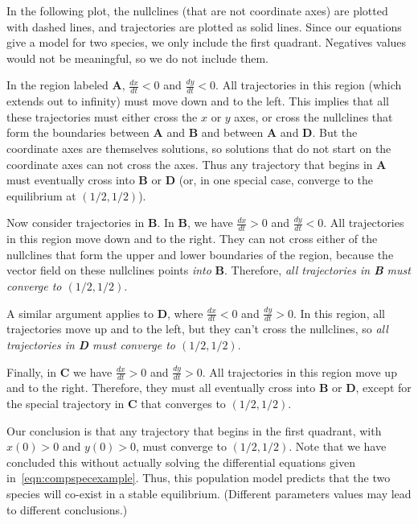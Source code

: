 \documentclass[reqno]{immbook}
\numberwithin{equation}{chapter}
\numberwithin{question}{section}
\numberwithin{theorem}{chapter}
\numberwithin{figure}{chapter}
\theoremstyle{definition}
\begin{document}
In the following plot, the nullclines (that are not coordinate
axes) are plotted with dashed lines, and trajectories
are plotted as solid lines.  Since our equations give 
a model for two species, we only include the first quadrant.
Negatives values would not be meaningful, so we do not include them.

\smallskip
\centerline{%
}

\medskip
\noindent
In the region labeled \textsf{\textbf{A}},
$\frac{dx}{dt}<0$ and $\frac{dy}{dt}<0$.
All trajectories in this region (which extends out to infinity)
must move down and to the left.  This implies that
all these trajectories must either cross the $x$ or $y$ axes,
or cross the nullclines that form the boundaries between
\textsf{\textbf{A}} and \textsf{\textbf{B}}
and between \textsf{\textbf{A}} and \textsf{\textbf{D}}.
But the coordinate axes are themselves solutions,
so solutions that do not start on the coordinate axes
can not cross the axes.  Thus any trajectory that begins in
\textsf{\textbf{A}} must eventually cross into
\textsf{\textbf{B}} or \textsf{\textbf{D}}
(or, in one special case, converge to the equilibrium
at $(1/2,1/2)$).

Now consider trajectories in \textsf{\textbf{B}}.
In \textsf{\textbf{B}}, we have
$\frac{dx}{dt} > 0$ and $\frac{dy}{dt} < 0$.
All trajectories in this region move down and to the right.
They can not cross either of the nullclines that
form the upper and lower boundaries of the region,
because the vector field on these nullclines points
\emph{into} \textsf{\textbf{B}}.  Therefore,
\emph{all trajectories in \textsf{\textbf{B}} must
converge to $(1/2,1/2)$}.

A similar argument applies to \textsf{\textbf{D}},
where $\frac{dx}{dt} < 0$ and $\frac{dy}{dt} >0$.
In this region, all trajectories move up and to the left,
but they can't cross the nullclines, so
\emph{all trajectories in \textsf{\textbf{D}} must
converge to $(1/2,1/2)$}.

Finally, in \textsf{\textbf{C}} we have
$\frac{dx}{dt} >0$ and $\frac{dy}{dt} > 0$.
All trajectories in this region move up and to the right.
Therefore, they must all eventually cross into
\textsf{\textbf{B}} or \textsf{\textbf{D}}, except
for the special trajectory in \textsf{\textbf{C}}
that converges to $(1/2,1/2)$.

Our conclusion is that any trajectory that begins in the
first quadrant, with $x(0)>0$ and $y(0)>0$, must
converge to $(1/2,1/2)$. Note that we have concluded this
without actually solving the differential equations
given in~\eqref{eqn:compspecexample}.
Thus, this population model
predicts that the two species will co-exist in 
a stable equilibrium.
(Different parameters values may lead to different
conclusions.)
\end{document}
